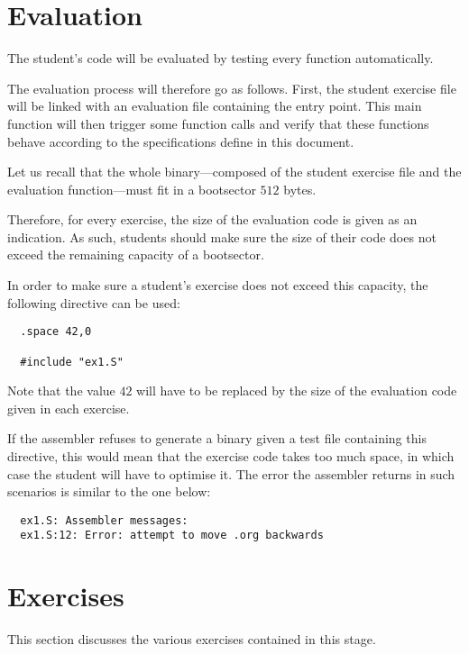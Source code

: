 %
%

\section{Evaluation}

The student's code will be evaluated by testing every function automatically.

The evaluation process will therefore go as follows. First, the student
exercise file will be linked with an evaluation file containing the entry
point. This main function will then trigger some function calls and verify
that these functions behave according to the specifications define in this
document.

Let us recall that the whole binary---composed of the student exercise file
and the evaluation function---must fit in a bootsector \ie{} $512$ bytes.

Therefore, for every exercise, the size of the evaluation code is given
as an indication. As such, students should make sure the size of their code
does not exceed the remaining capacity of a bootsector.

In order to make sure a student's exercise does not exceed this capacity,
the following directive can be used:

\begin{verbatim}
  .space 42,0

  #include "ex1.S"
\end{verbatim}

Note that the value $42$ will have to be replaced by the size of the
evaluation code given in each exercise.

If the assembler refuses to generate a binary given a test file containing
this directive, this would mean that the exercise code takes too much space,
in which case the student will have to optimise it. The error the assembler
returns in such scenarios is similar to the one below:

\begin{verbatim}
  ex1.S: Assembler messages:
  ex1.S:12: Error: attempt to move .org backwards
\end{verbatim}

%
%

\section{Exercises}

This section discusses the various exercises contained in this stage.

